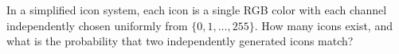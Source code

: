 In a simplified icon system, each icon is a single RGB color with each channel independently chosen uniformly from $\{0,1,\ldots,255\}$. How many icons exist, and what is the probability that two independently generated icons match?
